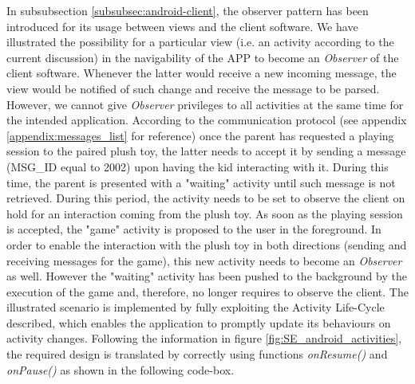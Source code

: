 \medskip
In subsubsection \ref{subsubsec:android-client}, the observer pattern has been introduced for its usage between views and the client software. We have illustrated the possibility for a particular view (i.e. an activity according to the current discussion) in the navigability of the APP to become an \textit{Observer} of the client software. Whenever the latter would receive a new incoming message, the view would be notified of such change and receive the message to be parsed. However, we cannot give \textit{Observer} privileges to all activities at the same time for the intended application. According to the communication protocol (see appendix \ref{appendix:messages_list} for reference) once the parent has requested a playing session to the paired plush toy, the latter needs to accept it by sending a message (MSG\_ID equal to 2002) upon having the kid interacting with it. During this time, the parent is presented with a "waiting" activity until such message is not retrieved. During this period, the activity needs to be set to observe the client on hold for an interaction coming from the plush toy. As soon as the playing session is accepted, the "game" activity is proposed to the user in the foreground. In order to enable the interaction with the plush toy in both directions (sending and receiving messages for the game), this new activity needs to become an \textit{Observer} as well. However the "waiting" activity has been pushed to the background by the execution of the game and, therefore, no longer requires to observe the client. The illustrated scenario is implemented by fully exploiting the Activity Life-Cycle described, which enables the application to promptly update its behaviours on activity changes. Following the information in figure \ref{fig:SE_android_activities}, the required design is translated by correctly using functions \textit{onResume()} and \textit{onPause()} as shown in the following code-box.

\vspace{0.5cm}

\vspace{0.5cm}

